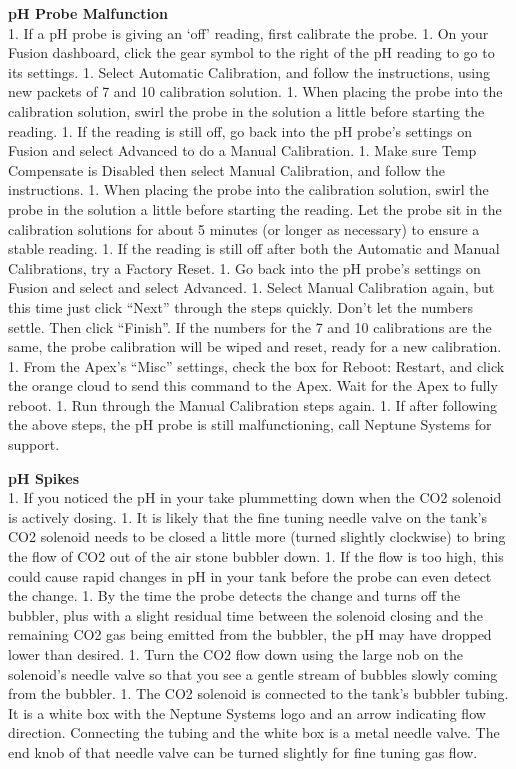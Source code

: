 \documentclass[]{book}
\begin{document}
 \textbf{pH Probe Malfunction}\\
1. If a pH probe is giving an `off' reading, first calibrate the probe.
1. On your Fusion dashboard, click the gear symbol to the right of the
pH reading to go to its settings. 1. Select Automatic Calibration, and
follow the instructions, using new packets of 7 and 10 calibration
solution. 1. When placing the probe into the calibration solution, swirl
the probe in the solution a little before starting the reading. 1. If
the reading is still off, go back into the pH probe's settings on Fusion
and select Advanced to do a Manual Calibration. 1. Make sure Temp
Compensate is Disabled then select Manual Calibration, and follow the
instructions. 1. When placing the probe into the calibration solution,
swirl the probe in the solution a little before starting the reading.
Let the probe sit in the calibration solutions for about 5 minutes (or
longer as necessary) to ensure a stable reading. 1. If the reading is
still off after both the Automatic and Manual Calibrations, try a
Factory Reset. 1. Go back into the pH probe's settings on Fusion and
select and select Advanced. 1. Select Manual Calibration again, but this
time just click ``Next'' through the steps quickly. Don't let the
numbers settle. Then click ``Finish''. If the numbers for the 7 and 10
calibrations are the same, the probe calibration will be wiped and
reset, ready for a new calibration. 1. From the Apex's ``Misc''
settings, check the box for Reboot: Restart, and click the orange cloud
to send this command to the Apex. Wait for the Apex to fully reboot. 1.
Run through the Manual Calibration steps again. 1. If after following
the above steps, the pH probe is still malfunctioning, call Neptune
Systems for support.

 \textbf{pH Spikes}\\
1. If you noticed the pH in your take plummetting down when the CO2
solenoid is actively dosing. 1. It is likely that the fine tuning needle
valve on the tank's CO2 solenoid needs to be closed a little more
(turned slightly clockwise) to bring the flow of CO2 out of the air
stone bubbler down. 1. If the flow is too high, this could cause rapid
changes in pH in your tank before the probe can even detect the change.
1. By the time the probe detects the change and turns off the bubbler,
plus with a slight residual time between the solenoid closing and the
remaining CO2 gas being emitted from the bubbler, the pH may have
dropped lower than desired. 1. Turn the CO2 flow down using the large
nob on the solenoid's needle valve so that you see a gentle stream of
bubbles slowly coming from the bubbler. 1. The CO2 solenoid is connected
to the tank's bubbler tubing. It is a white box with the Neptune Systems
logo and an arrow indicating flow direction. Connecting the tubing and
the white box is a metal needle valve. The end knob of that needle valve
can be turned slightly for fine tuning gas flow.


\end{document}
